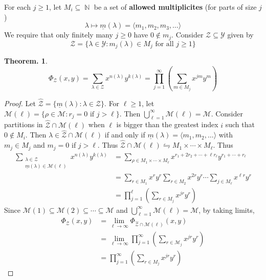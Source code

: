 \documentclass[11pt, a4paper]{memoir}
\DeclareMathOperator{\N}{{\mathbb{N}}}
\theoremstyle{change}
\newtheorem{theorem}{Theorem.}[section]
\theoremstyle{plain}
\theoremstyle{nonumberplain}
\newtheorem{proof}{Proof}
\numberwithin{equation}{section}
\begin{document}
For each $j\geq 1$, let $M_i\subseteq\N$ be a set of \textbf{allowed multiplicites} (for parts of size $j$)
\begin{equation*}
    \lambda\mapsto\underline{m}(\lambda)=\langle m_1,m_2,m_3,\ldots\rangle
\end{equation*}
We require that only finitely many $j\geq 0$ have $0\notin m_j$.
Consider $\mathcal{Z}\subseteq \mathcal{Y}$ given by
\begin{equation*}
    \mathcal{Z} = \{\lambda\in\mathcal{Y}:m_j(\lambda)\in M_j\text{ for all }j\geq 1\}
\end{equation*}
\begin{theorem}
    \begin{equation*}
        \Phi_{\mathcal{Z}}(x,y)=\sum_{\lambda\in\mathcal{Z}}x^{n(\lambda)}y^{k(\lambda)}=\prod_{j=1}^\infty\left(\sum_{m\in M_j}x^{jm}y^m\right)
    \end{equation*}
\end{theorem}
\begin{proof}
    Let $\hat{\mathcal{Z}}=\{\underline{m}(\lambda):\lambda\in\mathcal{Z}\}$.
    For $\ell\geq 1$, let $\mathcal{M}(\ell)=\{\rho\in\mathcal{M}:r_j=0\text{ if }j>\ell\}$.
    Then $\bigcup_{\ell=1}^\infty\mathcal{M}(\ell)=\mathcal{M}$.
    Consider partitions in $\hat{\mathcal{Z}}\cap\mathcal{M}(\ell)$ when $\ell$ is bigger than the greatest index $i$ such that $0\notin M_i$.
    Then $\lambda\in \hat{\mathcal{Z}}\cap\mathcal{M}(\ell)$ if and only if $\underline{m}(\lambda)=\langle m_1,m_2,\ldots\rangle$ with $m_j\in M_j$ and $m_j=0$ if $j>\ell$.
    Thus $\hat{\mathcal{Z}}\cap\mathcal{M}(\ell)\leftrightharpoons M_1\times\cdots\times M_\ell$.
    Thus
    \begin{align*}
        \sum_{\substack{\lambda\in\mathcal{Z}\\\underline{m}(\lambda)\in\mathcal{M}(\ell)}}x^{n(\lambda)}y^{k(\lambda)} &= \sum_{\rho\in M_1\times\cdots\times M_\ell}x^{r_1+2r_2+\cdots+\ell r_\ell}y^{r_1+\cdots+r_\ell}\\
                                                                                                                        &= \sum_{r\in M_1}x^ry^r\sum_{r\in M_2}x^{2r}y^r\cdots\sum_{j\in M_\ell}x^{\ell r}y^r\\
                                                                                                                        &= \prod_{j=1}^\ell\left(\sum_{r\in M_j}x^{jr}y^r\right)
    \end{align*}
    Since $\mathcal{M}(1)\subseteq\mathcal{M}(2)\subseteq\cdots\subseteq\mathcal{M}$ and $\bigcup_{\ell=1}^\infty\mathcal{M}(\ell)=\mathcal{M}$, by taking limits,
    \begin{align*}
        \Phi_{\mathcal{Z}}(x,y) &= \lim_{\ell\to\infty}\Phi_{\hat{\mathcal{Z}}\cap\mathcal{M}(\ell)}(x,y)\\
                                &= \lim_{\ell\to\infty}\prod_{j=1}^\infty\left(\sum_{r\in \mathcal{M}_j}x^{jr}y^r\right)\\
                                &= \prod_{j=1}^\infty\left(\sum_{r\in M_j}x^{jr}y^r\right)
    \end{align*}
\end{proof}
\end{document}
